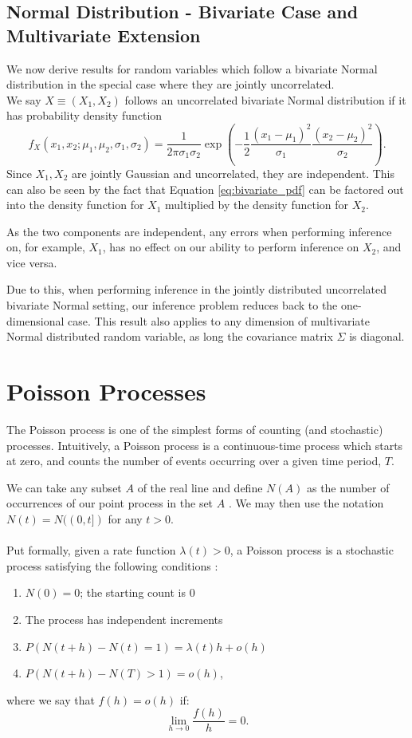 \documentclass[11pt,a4,twosided,singlespacing,titlepagenumber=on,numbers=endperiod]{scrreprt}
\numberwithin{equation}{chapter} %
\theoremstyle{remark}
\begin{document}
\section{Normal Distribution - Bivariate Case and Multivariate Extension}
We now derive results for random variables which follow a bivariate Normal distribution in the special case where they are jointly uncorrelated.\\
We say $X \equiv (X_1, X_2)$ follows an uncorrelated bivariate Normal distribution if it has probability density function
\begin{equation}\label{eq:bivariate_pdf}
	f_X(x_1, x_2; \mu_1, \mu_2, \sigma_1, \sigma_2) = \frac{1}{2 \pi \sigma_1 \sigma_2} \exp \left(-\frac{1}{2} \frac{(x_1 - \mu_1)^2}{\sigma_1} \frac{(x_2 - \mu_2)^2}{\sigma_2} \right).
\end{equation}
Since $X_1, X_2$ are jointly Gaussian and uncorrelated, they are independent. This can also be seen by the fact that Equation \ref{eq:bivariate_pdf} can be factored out into the density function for $X_1$ multiplied by the density function for $X_2$.

As the two components are independent, any errors when performing inference on, for example, $X_1$, has no effect on our ability to perform inference on $X_2$, and vice versa.

Due to this, when performing inference in the jointly distributed uncorrelated bivariate Normal setting, our inference problem reduces back to the one-dimensional case. This result also applies to any dimension of multivariate Normal distributed random variable, as long the covariance matrix $\Sigma$ is diagonal.

\chapter{Poisson Processes}

The Poisson process is one of the simplest forms of counting (and stochastic) processes. Intuitively, a Poisson process is a continuous-time process which starts at zero, and counts the number of events occurring over a given time period, $T$. 

We can take any subset $A$ of the real line and define $N(A)$ as the number of occurrences of our point process in the set $A$ \cite{daley_point_processes}. We may then use the notation $N(t) = N((0, t])$ for any $t > 0$.
\\\\
Put formally, given a rate function $\lambda(t) > 0$, a Poisson process is a stochastic process satisfying the following conditions \cite{daley_point_processes}:
\begin{enumerate}
	\item $N(0)= 0$; the starting count is 0
	\item The process has independent increments
	\item $P(N(t + h) - N(t) = 1) = \lambda(t)h + o(h)$
	\item $P(N(t+h) - N(T) >1) = o(h)$,
\end{enumerate}
where we say that $f(h) = o(h)$ if:
\begin{equation*}
	\lim_{h \to 0} \frac{f(h)}{h} = 0.
\end{equation*}
\end{document}
